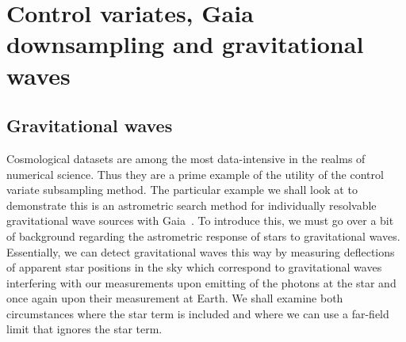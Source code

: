 \chapter{Control variates, Gaia downsampling and gravitational waves}\label{ch:chapter4}

\ifpdf
    \graphicspath{{Chapter4/Figs/Raster/}{Chapter4/Figs/PDF/}{Chapter4/Figs/}}
\else
    \graphicspath{{Chapter4/Figs/Vector/}{Chapter4/Figs/}}
\fi

\section{Gravitational waves}
Cosmological datasets are among the most data-intensive in the realms of numerical science. Thus they are a prime example of the utility of the control variate subsampling method. The particular example we shall look at to demonstrate this is an astrometric search method for individually resolvable gravitational wave sources with Gaia~\cite{Mihaylov_2020}. To introduce this, we must go over a bit of background regarding the astrometric response of stars to gravitational waves. Essentially, we can detect gravitational waves this way by measuring deflections of apparent star positions in the sky which correspond to gravitational waves interfering with our measurements upon emitting of the photons at the star and once again upon their measurement at Earth. We shall examine both circumstances where the star term is included and where we can use a far-field limit that ignores the star term.

